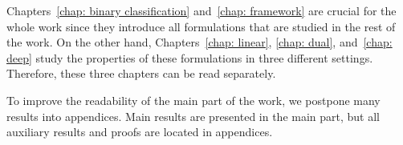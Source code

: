 Chapters~\ref{chap: binary classification} and~\ref{chap: framework} are crucial for the whole work since they introduce all formulations that are studied in the rest of the work. On the other hand, Chapters~\ref{chap: linear}, \ref{chap: dual}, and~\ref{chap: deep} study the properties of these formulations in three different settings. Therefore, these three chapters can be read separately. 

\begin{note}
  To improve the readability of the main part of the work, we postpone many results into appendices. Main results are presented in the main part, but all auxiliary results and proofs are located in appendices.
\end{note}
